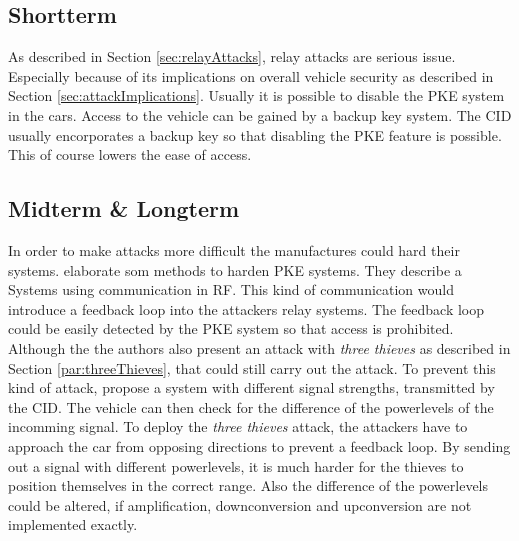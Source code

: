 
\subsection{Shortterm}
	As described in Section \ref{sec:relayAttacks}, relay attacks are serious issue.
	Especially because of its implications on overall vehicle security as described in Section \ref{sec:attackImplications}.
	Usually it is possible to disable the PKE system in the cars.
	Access to the vehicle can be gained by a backup key system.
	The CID usually encorporates a backup key so that disabling the PKE feature is possible.
	This of course lowers the ease of access.

\subsection{Midterm \& Longterm}
	In order to make attacks more difficult the manufactures could hard their systems.
	\citeauthor{someAttacksPKES} elaborate som methods to harden PKE systems.
	They describe a Systems using communication in RF.
	This kind of communication would introduce a feedback loop into the attackers relay systems.
	The feedback loop could be easily detected by the PKE system so that access is prohibited.
	Although the the authors also present an attack with \textsl{three thieves}
	as described in Section \ref{par:threeThieves}, that could still
	carry out the attack.
	To prevent this kind of attack,
	\citeauthor{someAttacksPKES} propose a system with different signal strengths,
	transmitted by the CID.
	The vehicle can then check for the difference of the powerlevels of the incomming signal.
	To deploy the \textsl{three thieves} attack,
	the attackers have to approach the car from opposing directions to prevent a feedback loop.
	By sending out a signal with different powerlevels,
	it is much harder for the thieves to position themselves in the correct range.
	Also the difference of the powerlevels could be altered,
	if amplification, downconversion and upconversion are not implemented exactly.

	

